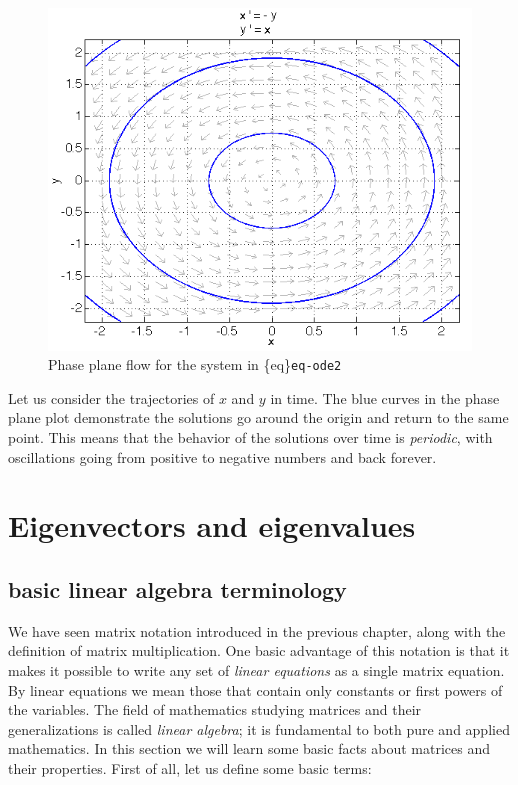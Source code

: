\documentclass[
  letterpaper,
  DIV=11,
  numbers=noendperiod]{scrreprt}
\begin{document}
\begin{figure}

{\centering \includegraphics{./images/week6_pp2.png}

}

\caption{Phase plane flow for the system in \{eq\}\texttt{eq-ode2}}

\end{figure}

Let us consider the trajectories of \(x\) and \(y\) in time. The blue
curves in the phase plane plot demonstrate the solutions go around the
origin and return to the same point. This means that the behavior of the
solutions over time is \emph{periodic}, with oscillations going from
positive to negative numbers and back forever.

\hypertarget{eigenvectors-and-eigenvalues}{%
\section{Eigenvectors and
eigenvalues}\label{eigenvectors-and-eigenvalues}}

\hypertarget{basic-linear-algebra-terminology}{%
\subsection{basic linear algebra
terminology}\label{basic-linear-algebra-terminology}}

We have seen matrix notation introduced in the previous chapter, along
with the definition of matrix multiplication. One basic advantage of
this notation is that it makes it possible to write any set of
\emph{linear equations} as a single matrix equation. By linear equations
we mean those that contain only constants or first powers of the
variables. The field of mathematics studying matrices and their
generalizations is called \emph{linear algebra}; it is fundamental to
both pure and applied mathematics. In this section we will learn some
basic facts about matrices and their properties. First of all, let us
define some basic terms:
\end{document}
